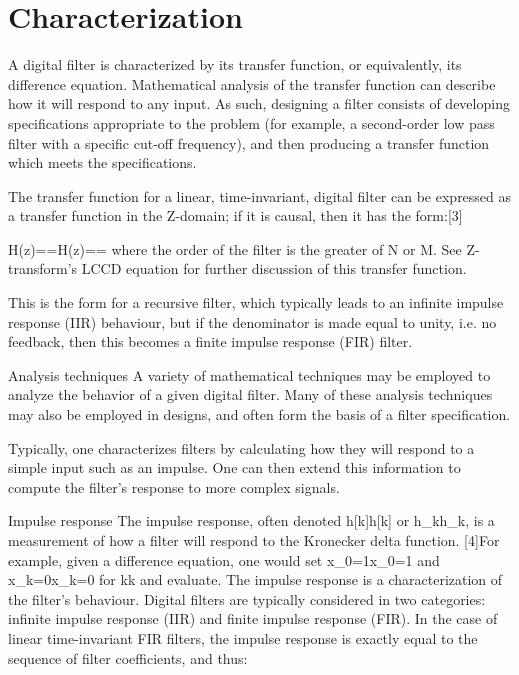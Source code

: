 \documentclass[12pt,a4paper,twocolumn]{scrartcl}
\begin{document}
\tableofcontents
\section{\centering Characterization}
A digital filter is characterized by its transfer function, or equivalently, its difference equation. Mathematical analysis of the transfer function can describe how it will respond to any input. As such, designing a filter consists of developing specifications appropriate to the problem (for example, a second-order low pass filter with a specific cut-off frequency), and then producing a transfer function which meets the specifications.

The transfer function for a linear, time-invariant, digital filter can be expressed as a transfer function in the Z-domain; if it is causal, then it has the form:[3]

{\displaystyle H(z)={}={}}H(z)={}={}
where the order of the filter is the greater of N or M. See Z-transform's LCCD equation for further discussion of this transfer function.

This is the form for a recursive filter, which typically leads to an infinite impulse response (IIR) behaviour, but if the denominator is made equal to unity, i.e. no feedback, then this becomes a finite impulse response (FIR) filter.

Analysis techniques
A variety of mathematical techniques may be employed to analyze the behavior of a given digital filter. Many of these analysis techniques may also be employed in designs, and often form the basis of a filter specification.

Typically, one characterizes filters by calculating how they will respond to a simple input such as an impulse. One can then extend this information to compute the filter's response to more complex signals.

Impulse response
The impulse response, often denoted {\displaystyle h[k]}h[k] or {\displaystyle h_{k}}h_{k}, is a measurement of how a filter will respond to the Kronecker delta function. [4]For example, given a difference equation, one would set {\displaystyle x_{0}=1}x_{0}=1 and {\displaystyle x_{k}=0}x_{k}=0 for {\displaystyle k}k and evaluate. The impulse response is a characterization of the filter's behaviour. Digital filters are typically considered in two categories: infinite impulse response (IIR) and finite impulse response (FIR). In the case of linear time-invariant FIR filters, the impulse response is exactly equal to the sequence of filter coefficients, and thus:
\end{document}
